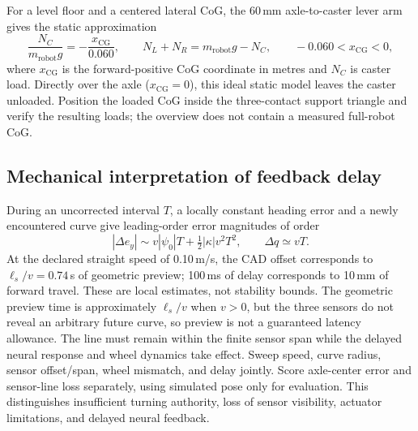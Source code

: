 For a level floor and a centered lateral CoG, the 60\,mm axle-to-caster lever arm gives the static approximation
\begin{equation}
 \frac{N_C}{m_{\mathrm{robot}}g}=-\frac{x_{\mathrm{CG}}}{0.060},\qquad
 N_L+N_R=m_{\mathrm{robot}}g-N_C,\qquad -0.060<x_{\mathrm{CG}}<0,
 \label{eq:caster-load}
\end{equation}
where $x_{\mathrm{CG}}$ is the forward-positive CoG coordinate in metres and $N_C$ is caster load. Directly over the axle ($x_{\mathrm{CG}}=0$), this ideal static model leaves the caster unloaded. Position the loaded CoG inside the three-contact support triangle and verify the resulting loads; the overview does not contain a measured full-robot CoG.

\subsection{Mechanical interpretation of feedback delay}
During an uncorrected interval $T$, a locally constant heading error and a newly encountered curve give leading-order error magnitudes of order
\begin{equation}
 |\Delta e_y|\sim v|\psi_0|T+\tfrac12|\kappa|v^2T^2,
 \qquad \Delta q\simeq vT.
 \label{eq:delay-distance}
\end{equation}
At the declared straight speed of 0.10\,m/s, the CAD offset corresponds to $\ell_s/v=0.74$\,s of geometric preview; 100\,ms of delay corresponds to 10\,mm of forward travel. These are local estimates, not stability bounds. The geometric preview time is approximately $\ell_s/v$ when $v>0$, but the three sensors do not reveal an arbitrary future curve, so preview is not a guaranteed latency allowance. The line must remain within the finite sensor span while the delayed neural response and wheel dynamics take effect. Sweep speed, curve radius, sensor offset/span, wheel mismatch, and delay jointly. Score axle-center error and sensor-line loss separately, using simulated pose only for evaluation. This distinguishes insufficient turning authority, loss of sensor visibility, actuator limitations, and delayed neural feedback.


